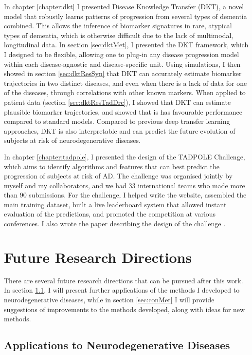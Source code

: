 In chapter \ref{chapter:dkt} I presented Disease Knowledge Transfer (DKT), a novel model that robustly learns patterns of progression from several types of dementia combined. This allows the inference of biomarker signatures in rare, atypical types of dementia, which is otherwise difficult due to the lack of multimodal, longitudinal data. In section \ref{sec:dktMet}, I presented the DKT framework, which I designed to be flexible, allowing one to plug-in any disease progression model within each disease-agnostic and disease-specific unit. Using simulations, I then showed in section \ref{sec:dktResSyn} that DKT can accurately estimate biomarker trajectories in two distinct diseases, and even when there is a lack of data for one of the diseases, through correlations with other known markers. When applied to patient data (section \ref{sec:dktResTadDrc}), I showed that DKT can estimate plausible biomarker trajectories, and showed that is has favourable performance compared to standard models. Compared to previous deep transfer learning approaches, DKT is also interpretable and can predict the future evolution of subjects at risk of neurodegenerative diseases.

In chapter \ref{chapter:tadpole}, I presented the design of the TADPOLE Challenge, which aims to identify algorithms and features that can best predict the progression of subjects at risk of AD. The challenge was organised jointly by myself and my collaborators, and we had 33 international teams who made more than 90 submissions. For the challenge, I helped write the website, assembled the main training dataset, built a live leaderboard system that allowed instant evaluation of the predictions, and promoted the competition at various conferences. I also wrote the paper describing the design of the challenge \cite{marinescu2018tadpole}.

\section{Future Research Directions}
\label{sec:conFut}

There are several future research directions that can be pursued after this work. In section \ref{sec:conNeu}, I will present further applications of the methods I developed to neurodegenerative diseases, while in section \ref{sec:conMet} I will provide suggestions of improvements to the methods developed, along with ideas for new methods.

\subsection{Applications to Neurodegenerative Diseases}
\label{sec:conNeu}

